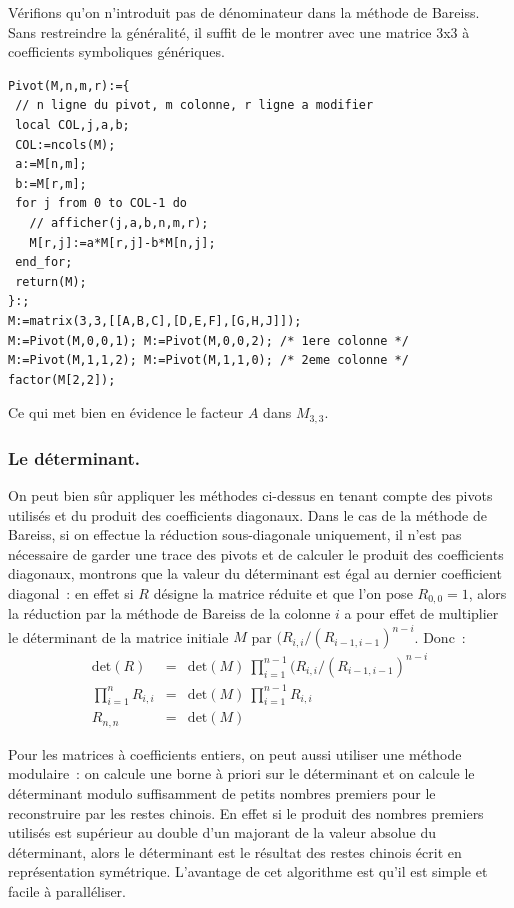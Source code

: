 \documentclass[a4paper,11pt]{article}
\begin{document}
V\'erifions
qu'on n'introduit pas de dénominateur dans la méthode
de Bareiss. Sans
restreindre la généralité, il suffit de le montrer avec une
matrice 3x3 \`a coefficients symboliques génériques. 
\begin{verbatim}
Pivot(M,n,m,r):={ 
 // n ligne du pivot, m colonne, r ligne a modifier
 local COL,j,a,b; 
 COL:=ncols(M);
 a:=M[n,m];
 b:=M[r,m];
 for j from 0 to COL-1 do
   // afficher(j,a,b,n,m,r);
   M[r,j]:=a*M[r,j]-b*M[n,j];
 end_for;
 return(M);
}:; 
M:=matrix(3,3,[[A,B,C],[D,E,F],[G,H,J]]);
M:=Pivot(M,0,0,1); M:=Pivot(M,0,0,2); /* 1ere colonne */
M:=Pivot(M,1,1,2); M:=Pivot(M,1,1,0); /* 2eme colonne */
factor(M[2,2]);
\end{verbatim}
Ce qui met bien en évidence le facteur $A$ dans $M_{3,3}$.

\subsubsection{Le d\'eterminant.}
On peut bien sûr appliquer les m\'ethodes ci-dessus en tenant compte
des pivots utilisés et du produit des coefficients diagonaux. Dans le cas de 
la méthode de Bareiss, si on effectue la réduction sous-diagonale
uniquement, il n'est pas nécessaire de garder une trace des pivots
et de calculer le produit des coefficients diagonaux,
montrons que la valeur du d\'eterminant est égal au 
dernier coefficient diagonal~: en effet si $R$ désigne la matrice réduite et
que l'on pose $R_{0,0}=1$, alors la réduction par la méthode de
Bareiss de la colonne $i$ a pour effet de multiplier le déterminant 
de la matrice initiale $M$ par $(R_{i,i}/(R_{i-1,i-1})^{n-i}$. Donc~:
\begin{eqnarray*}
 \mbox{det}(R)&=&\mbox{det}(M) \ \prod_{i=1}^{n-1}
(R_{i,i}/(R_{i-1,i-1})^{n-i} \\
\prod_{i=1}^{n} R_{i,i}&=& \mbox{det}(M) \ \prod_{i=1}^{n-1} R_{i,i}  \\
R_{n,n} &=& \mbox{det}(M)
\end{eqnarray*}


Pour les matrices \`a coefficients entiers, on peut aussi utiliser une
m\'ethode 
modulaire~:
on calcule une borne \`a priori sur le d\'eterminant
et on calcule le d\'eterminant modulo suffisamment de petits nombres
premiers pour le reconstruire par les restes chinois. En effet
si le produit des nombres premiers utilisés
est supérieur au double d'un majorant de la valeur absolue du
déterminant, alors le déterminant est le résultat des restes chinois
écrit en représentation symétrique.
L'avantage de cet algorithme est qu'il est simple et facile à paralléliser.
\end{document}
